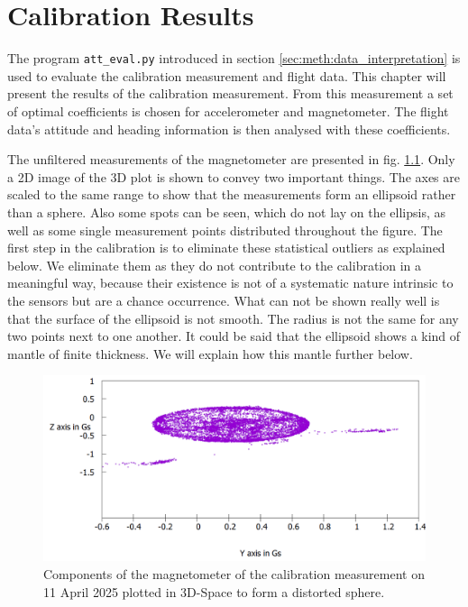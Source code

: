 \chapter{Calibration Results \label{ch:calibration_results}}
The program \verb|att_eval.py| introduced in section \ref{sec:meth:data_interpretation} is used to evaluate the calibration measurement and flight data. This chapter will present the results of the calibration measurement. From this measurement a set of optimal coefficients is chosen for accelerometer and magnetometer. The flight data's attitude and heading information is then analysed with these coefficients.

The unfiltered measurements of the magnetometer are presented in fig. \ref{fig:res:raw_cali}. Only a 2D image of the 3D plot is shown to convey two important things. The axes are scaled to the same range to show that the measurements form an ellipsoid rather than a sphere. Also some spots can be seen, which do not lay on the ellipsis, as well as some single measurement points distributed throughout the figure. The first step in the calibration is to eliminate these statistical outliers as explained below. We eliminate them as they do not contribute to the calibration in a meaningful way, because their existence is not of a systematic nature intrinsic to the sensors but are a chance occurrence. What can not be shown really well is that the surface of the ellipsoid is not smooth. The radius is not the same for any two points next to one another. It could be said that the ellipsoid shows a kind of mantle of finite thickness. We will explain how this mantle further below.

\begin{figure}[H]
    \centering
    \includegraphics[width=\linewidth]{images/04_results/raw_sphere_2025-04-11_y_z_axes.png}
    \caption{Components of the magnetometer of the calibration measurement on 11 April 2025 plotted in 3D-Space to form a distorted sphere.}
    \label{fig:res:raw_cali}
\end{figure}

